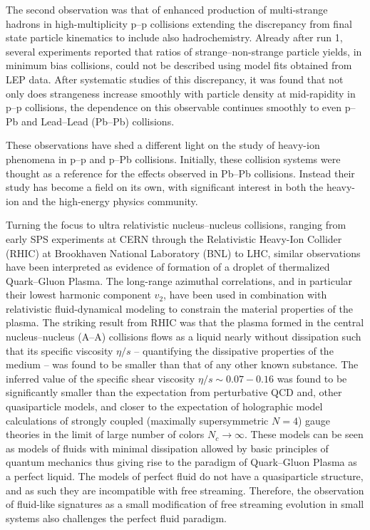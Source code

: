 \documentclass[../report.tex]{subfiles}
\begin{document}
The second observation was that of enhanced production of multi-strange hadrons in high-multiplicity p--p collisions extending the discrepancy from final state particle kinematics to include also hadrochemistry. Already after run 1, several experiments reported that ratios of strange--non-strange particle yields, in minimum bias collisions, could not be described using model fits obtained from LEP data. After systematic studies of this discrepancy, it was found that not only does strangeness increase smoothly with particle density at mid-rapidity in p--p collisions, the dependence on this observable continues smoothly to even p--Pb and Lead--Lead (Pb--Pb) collisions.

These observations have shed a different light on the study of heavy-ion phenomena in p--p and p--Pb collisions. Initially, these collision systems were thought as a reference for the effects observed in Pb--Pb collisions. Instead their study has become a field on its own, with significant interest in both the heavy-ion and the high-energy physics community.


Turning the focus to ultra relativistic nucleus--nucleus collisions, ranging from early SPS experiments at CERN through the Relativistic Heavy-Ion Collider (RHIC) at Brookhaven National Laboratory (BNL) to LHC, similar observations have been interpreted as evidence of formation of a droplet of thermalized Quark--Gluon Plasma. The long-range azimuthal correlations, and in particular their lowest harmonic component $v_2$, have been used in combination with relativistic fluid-dynamical modeling to constrain the material properties of the plasma.  The striking result from RHIC was that the plasma formed in the central nucleus--nucleus (A--A) collisions flows as a liquid nearly without dissipation such that its specific viscosity $\eta/s$ -- quantifying the dissipative properties of the medium -- was found to be smaller than that of any other known substance. The inferred value of the specific shear viscosity $\eta/s\sim 0.07-0.16$ was found to be significantly smaller than the expectation from perturbative QCD and, other quasiparticle models, and closer to the expectation of holographic model calculations of strongly coupled (maximally supersymmetric $N=4$) gauge theories in the limit of large number of colors $N_c \rightarrow \infty$. These models can be seen as models of fluids with minimal dissipation allowed by basic principles of quantum mechanics thus giving rise to the paradigm of Quark--Gluon Plasma as a perfect liquid. The models of perfect fluid do not have a quasiparticle structure, and as such they are incompatible with free streaming. Therefore, the observation of fluid-like signatures as a small modification of free streaming evolution in small systems also challenges the perfect fluid paradigm. 
\end{document}
